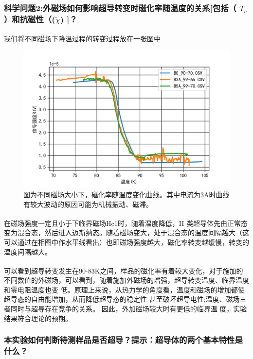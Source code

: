 \documentclass{ctexart}                                     %
\theoremstyle{ansstyle}
\begin{document}
\subsubsection{科学问题2:外磁场如何影响超导转变时磁化率随温度的关系[包括（ $T_{c}$）和抗磁性（($\tilde{\chi}$) ]？}
\paragraph{}我们将不同磁场下降温过程的转变过程放在一张图中
\begin{figure}[H]
    \centering
    \includegraphics[width=1.\linewidth]{./png/10.png}
    \caption{图为不同磁场大小下，磁化率随温度变化曲线。其中电流为3A时曲线有较大波动的原因可能为机械振动、磁滞。}
\end{figure}
\paragraph{}在磁场强度一定且小于下临界磁场Hc1时，随着温度降低，II 类超导体先由正常态变为混合态，然后进入迈斯纳态。随着磁场变大，处于混合态的温度间隔越大（这可以通过在相图中作水平线看出）也即磁场强度越大，磁化率转变越缓慢，转变的温度间隔越大。
\paragraph{}可以看到超导转变发生在90-83K之间，样品的磁化率有着较大变化，对于施加的不同数值的外磁场，可以看到，随着施加外磁场的增强，超导转变温度、临界温度和零电阻温度也变
低。原理上来说，从热力学的角度看，温度和磁场的增加都使超导态的自由能增加，从而降低超导态的稳定性
甚至破坏超导电性;温度、磁场三者同时与超导存在竞争的关系。 因此，外加磁场较大时有更低的临界温
度，实验结果符合理论的预期。
\subsubsection{本实验如何判断待测样品是否超导？提示：超导体的两个基本特性是
    什么？}
\end{document}
